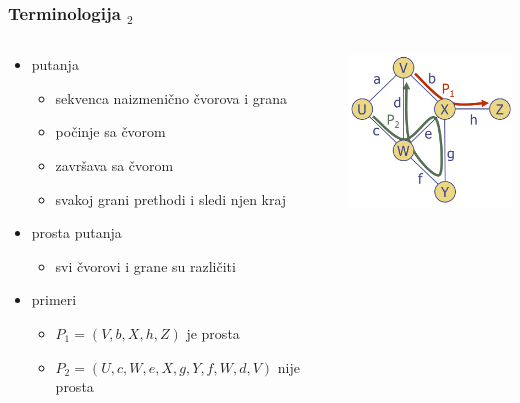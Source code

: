 \documentclass[compress]{beamer}
\begin{document}
\begin{frame}[fragile]
  \frametitle{Terminologija $_{2}$}
  \begin{columns}
    \begin{column}[t]{7.5cm}
      \begin{itemize}
        \item putanja
        \begin{itemize}
          \item sekvenca naizmenično čvorova i grana
          \item počinje sa čvorom
          \item završava sa čvorom
          \item svakoj grani prethodi i sledi njen kraj
        \end{itemize}
        \item prosta putanja
        \begin{itemize}
          \item svi čvorovi i grane su različiti
        \end{itemize}
        \item primeri
        \begin{itemize}
          \item $P_{1}=(V,b,X,h,Z)$ je prosta
          \item $P_{2}=(U,c,W,e,X,g,Y,f,W,d,V)$ nije prosta
        \end{itemize}
      \end{itemize}
    \end{column}
    \begin{column}[t]{4.5cm}
      \begin{center}
        \includegraphics[width=4.5cm]{asp-14-pic05.png}
      \end{center}
    \end{column}
  \end{columns}
\end{frame}
\end{document}
